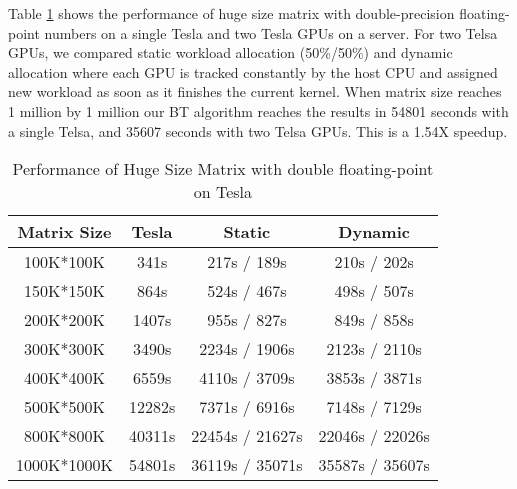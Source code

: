 Table \ref{tab:hugeResultTesla} shows the performance of huge size matrix with double-precision floating-point numbers on a single Tesla and two Tesla GPUs on a server. For two Telsa GPUs, we compared static workload allocation (50\%/50\%) and dynamic allocation where each GPU is tracked constantly by the host CPU and assigned new workload as soon as it finishes the current kernel. 
When matrix size reaches 1 million by 1
million our BT algorithm reaches the results in 54801 seconds
with a single Telsa, and 35607 seconds with two Telsa GPUs. This is a 1.54X speedup.
\begin{table}[h]
\vspace{-0.3in}
\caption{Performance of Huge Size Matrix with double floating-point on Tesla}
\vspace{-0.1in}
\centering
\begin{tabular}{|c|c|c|c|}
\hline
Matrix Size &  Tesla  & Static & Dynamic \\ \hline
 100K*100K  &   341s  &  217s / 189s &  210s / 202s \\ \hline
 150K*150K  &   864s  &  524s / 467s &  498s / 507s \\ \hline
 200K*200K  &  1407s  &  955s / 827s &  849s / 858s \\ \hline
 300K*300K  &  3490s  & 2234s / 1906s & 2123s / 2110s\\ \hline
 400K*400K  &  6559s  & 4110s / 3709s & 3853s / 3871s\\ \hline
 500K*500K  & 12282s  & 7371s / 6916s  & 7148s / 7129s\\ \hline
 800K*800K  & 40311s  & 22454s / 21627s &  22046s / 22026s   \\ \hline
 1000K*1000K & 54801s  & 36119s / 35071s   &  35587s / 35607s \\ \hline
\end{tabular}
\label{tab:hugeResultTesla}
\vspace{-0.5in}
\end{table}

